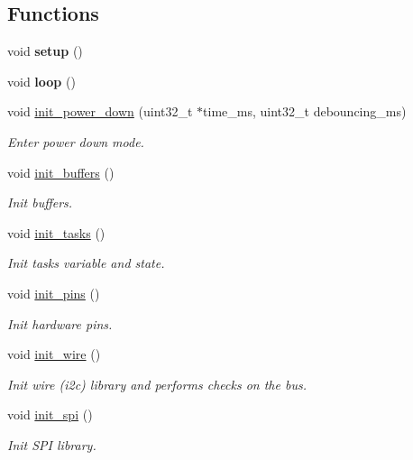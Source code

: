 \subsection*{Functions}
\begin{DoxyCompactItemize}
\item 
\mbox{\label{rmap_8ino_a4fc01d736fe50cf5b977f755b675f11d}} 
void {\bfseries setup} ()
\item 
\mbox{\label{rmap_8ino_afe461d27b9c48d5921c00d521181f12f}} 
void {\bfseries loop} ()
\item 
void \hyperlink{rmap_8ino_afb98a0f07c30784284f48271ffe02b97}{init\+\_\+power\+\_\+down} (uint32\+\_\+t $\ast$time\+\_\+ms, uint32\+\_\+t debouncing\+\_\+ms)
\begin{DoxyCompactList}\small\item\em Enter power down mode. \end{DoxyCompactList}\item 
void \hyperlink{rmap_8ino_ad241cc00b1a92e6d85827df96778e442}{init\+\_\+buffers} ()
\begin{DoxyCompactList}\small\item\em Init buffers. \end{DoxyCompactList}\item 
void \hyperlink{rmap_8ino_ab4bf0a3d77da083f131d3fa35a37d2b1}{init\+\_\+tasks} ()
\begin{DoxyCompactList}\small\item\em Init tasks variable and state. \end{DoxyCompactList}\item 
void \hyperlink{rmap_8ino_ad8b80a0c08f928106018edd6ea435b95}{init\+\_\+pins} ()
\begin{DoxyCompactList}\small\item\em Init hardware pins. \end{DoxyCompactList}\item 
void \hyperlink{rmap_8ino_a2441543100bf8421f56edd622a2c1d9a}{init\+\_\+wire} ()
\begin{DoxyCompactList}\small\item\em Init wire (i2c) library and performs checks on the bus. \end{DoxyCompactList}\item 
void \hyperlink{rmap_8ino_a8eb9780a3438ec02c70314744f91f3c7}{init\+\_\+spi} ()
\begin{DoxyCompactList}\small\item\em Init S\+PI library. \end{DoxyCompactList}\item 

\end{DoxyCompactItemize}

